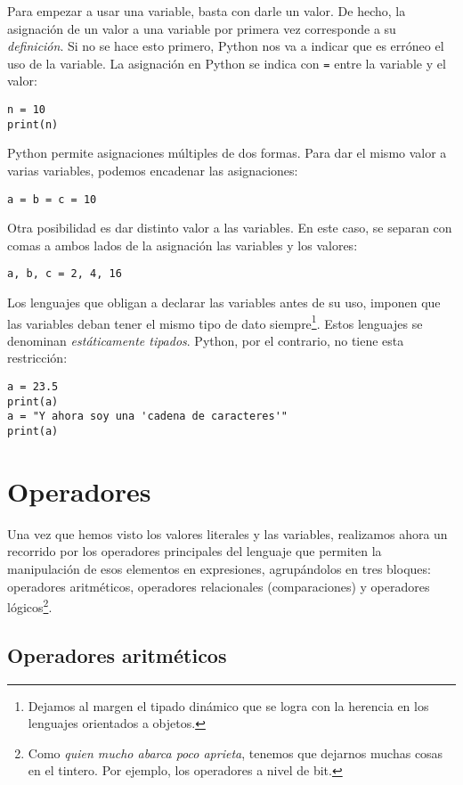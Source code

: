 Para empezar a usar una variable, basta con darle un valor. De hecho, la asignación de un valor a una variable por primera vez corresponde a su \emph{definición}. Si no se hace esto primero, Python nos va a indicar que es erróneo el uso de la variable. La asignación en Python se indica con \texttt{=} entre la variable y el valor:

\begin{lstlisting}
n = 10
print(n)
\end{lstlisting}

Python permite asignaciones múltiples de dos formas. Para dar el mismo valor a varias variables, podemos encadenar las asignaciones:

\begin{lstlisting}
a = b = c = 10
\end{lstlisting}

Otra posibilidad es dar distinto valor a las variables. En este caso, se separan con comas a ambos lados de la asignación las variables y los valores:
\begin{lstlisting}
a, b, c = 2, 4, 16
\end{lstlisting}

Los lenguajes que obligan a declarar las variables antes de su uso, imponen que las variables deban tener el mismo tipo de dato siempre\footnote{Dejamos al margen el tipado dinámico que se logra con la herencia en los lenguajes orientados a objetos.}. Estos lenguajes se denominan \emph{estáticamente tipados}. Python, por el contrario, no tiene esta restricción:

\begin{lstlisting}
a = 23.5
print(a)
a = "Y ahora soy una 'cadena de caracteres'"
print(a)
\end{lstlisting}


\section{Operadores}

Una vez que hemos visto los valores literales y las variables, realizamos ahora un recorrido por los operadores principales del lenguaje que permiten la manipulación de esos elementos en expresiones, agrupándolos en tres bloques: operadores aritméticos, operadores relacionales (comparaciones) y operadores lógicos\footnote{Como \emph{quien mucho abarca poco aprieta}, tenemos que dejarnos muchas cosas en el tintero. Por ejemplo, los operadores a nivel de bit.}.

\subsection{Operadores aritméticos}


